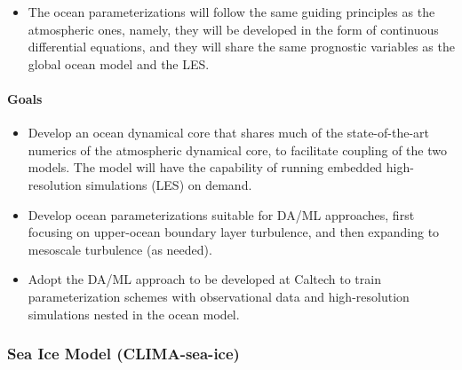 \documentclass{article}
\begin{document}
\begin{itemize}
    \item The ocean parameterizations will follow the same guiding principles as the atmospheric ones, namely, they will be developed in the form of continuous differential equations, and they will share the same prognostic variables as the global ocean model and the LES.
\end{itemize}

\paragraph{Goals}
\begin{itemize}
    \item Develop an ocean dynamical core that shares much of the state-of-the-art numerics of the atmospheric dynamical core, to facilitate coupling of the two models. The model will have the capability of running embedded high-resolution simulations (LES) on demand.
    \item Develop ocean parameterizations suitable for DA/ML approaches, first focusing on upper-ocean boundary layer turbulence, and then expanding to mesoscale turbulence (as needed).
    \item Adopt the DA/ML approach to be developed at Caltech to train parameterization schemes with observational data and high-resolution simulations nested in the ocean model.
\end{itemize}

\subsubsection{Sea Ice Model (CLIMA-sea-ice)}
\end{document}
